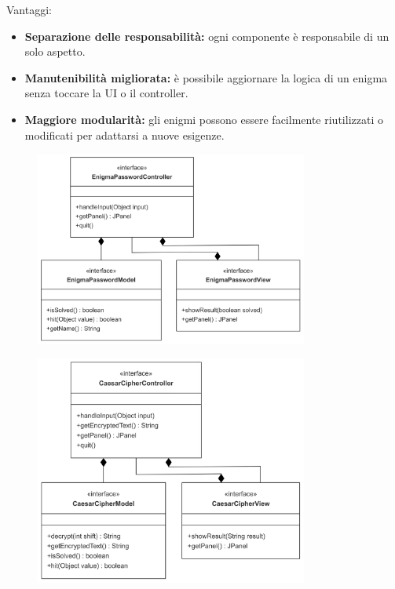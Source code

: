 \documentclass[a4paper,12pt]{report}
\begin{document}
Vantaggi:
\begin{itemize}
	\item \textbf{Separazione delle responsabilità:} ogni componente è responsabile di un solo aspetto. 
	\item \textbf{Manutenibilità migliorata:} è possibile aggiornare la logica di un enigma senza toccare la UI o il controller.
	\item \textbf{Maggiore modularità:} gli enigmi possono essere facilmente riutilizzati o modificati per adattarsi a nuove esigenze.
\end{itemize}
\begin{figure} 
    \centering
    \includegraphics[width=0.8\textwidth]{img/enigmaPassword.png}
    \label{img:enigmaPassword}
\end{figure}
\begin{figure} 
    \centering
    \includegraphics[width=0.8\textwidth]{img/caesarCipher.png}
    \label{img:caesarCipher}
\end{figure}
%
\end{document}
